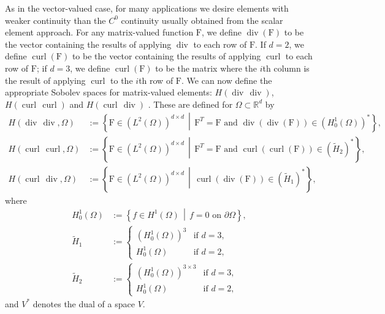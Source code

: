 \documentclass[sn-mathphys-num]{sn-jnl}%
\theoremstyle{thmstyleone}%
\newcommand{\mat}[1]{\boldsymbol{\mathrm{#1}}}
\newcommand{\scurl}{\operatorname{curl}}
\newcommand{\sdiv}{\operatorname{div}}
\newcommand{\vcurl}{\scurl}
\newcommand{\transpose}{^T}
\theoremstyle{thmstyletwo}%
\theoremstyle{thmstylethree}%
\begin{document}
As in the vector-valued case, for many applications we desire elements with weaker continuity than the
$C^0$ continuity usually obtained from the scalar element approach.
For any matrix-valued function $\mat{F}$, we define
$\sdiv(\mat{F})$ to be the vector containing the results of applying $\sdiv$ to each row of $\mat{F}$.
If $d=2$, we define $\scurl(\mat{F})$ to be the vector containing the results of applying $\scurl$ to each row of $\mat{F}$;
if $d=3$, we define $\scurl(\mat{F})$ to be the matrix where the $i$th column is the result of applying $\scurl$ to the $i$th row of $\mat{F}$.
We can now define the appropriate
Sobolev spaces for matrix-valued elements:
\newcommand{\curlcurllabel}{2}
\newcommand{\curldivlabel}{1}
$H(\sdiv\,\sdiv)$,
$H(\vcurl\,\vcurl)$ and
$H(\vcurl\,\sdiv)$ \cite{formulae-and-transformations,gopalakrishnan-lederer-schoberl}. These are defined for $\Omega\subset\mathbb{R}^d$ by
\begin{align*}
H(\sdiv\,\sdiv, \Omega)&:=\left\{
    \mat{F}\in\left(L^2(\Omega)\right)^{d\times d}
    \,\middle|\,
    \mat{F}\transpose=\mat{F}
    \text{ and }
    \sdiv(\sdiv(\mat{F}))\in\left(H^1_0(\Omega)\right)^*
\right\},\\
H(\vcurl\,\vcurl, \Omega)&:=\left\{
    \mat{F}\in\left(L^2(\Omega)\right)^{d\times d}
    \,\middle|\,
    \mat{F}\transpose=\mat{F}
    \text{ and }
    \scurl(\scurl(\mat{F}))\in\left(\tilde{H}_{\curlcurllabel}\right)^*
\right\},\\
H(\vcurl\,\sdiv, \Omega)&:=\left\{
    \mat{F}\in\left(L^2(\Omega)\right)^{d\times d}
    \,\middle|\,
    \scurl(\sdiv(\mat{F}))\in\left(\tilde{H}_{\curldivlabel}\right)^*
\right\},
\end{align*}
where
\begin{align*}
H^1_0(\Omega)&:=\left\{f\in H^1(\Omega)\,\middle|\,f=0\text{ on }\partial\Omega\right\},\\
\tilde{H}_{\curldivlabel}&:=\begin{cases}\left(H^1_0(\Omega)\right)^3&\text{if }d=3,\\H^1_0(\Omega)&\text{if }d=2,\end{cases}\\
\tilde{H}_{\curlcurllabel}&:=\begin{cases}\left(H^1_0(\Omega)\right)^{3\times3}&\text{if }d=3,\\H^1_0(\Omega)&\text{if }d=2,\end{cases}
\end{align*}
and $V^*$ denotes the dual of a space $V$.
\end{document}
